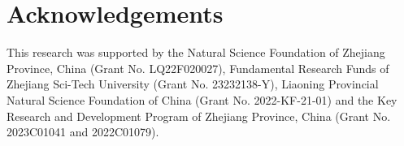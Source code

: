 \documentclass[a4paper,fleqn]{cas-dc}
\newcommand{\1}[1]{\mathds{1}\left[#1\right]}
\begin{document}

%

\section*{Acknowledgements}
This research was supported by the Natural Science Foundation of Zhejiang Province, China (Grant No. LQ22F020027), Fundamental Research Funds of Zhejiang Sci-Tech University (Grant No. 23232138-Y), Liaoning Provincial Natural Science Foundation of China (Grant No. 2022-KF-21-01) and the Key Research and Development Program of Zhejiang Province, China (Grant No. 2023C01041 and 2022C01079).


% 

\end{document}
